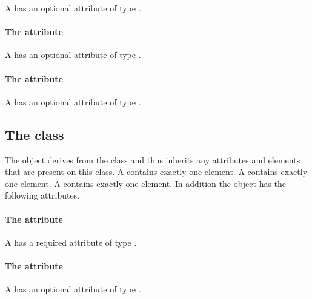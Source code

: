 A \Style has an optional attribute  of type
.

\paragraph{The \fixttspace{} attribute}

A \Style has an optional attribute  of type
.

\paragraph{The \fixttspace{} attribute}

A \Style has an optional attribute  of type
.

\subsection{The  class}
\label{renderinformationbase-class}


The \RenderInformationBase object derives from the  class
and thus inherits any attributes and elements that are present on this
class.
A \RenderInformationBase contains exactly one
 element.
A \RenderInformationBase contains exactly one
 element.
A \RenderInformationBase contains exactly one 
element.
In addition the \RenderInformationBase object has the following
attributes.

\paragraph{The \fixttspace{} attribute}

A \RenderInformationBase has a required attribute  of type
.

\paragraph{The \fixttspace{} attribute}

A \RenderInformationBase has an optional attribute  of type
.

